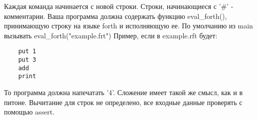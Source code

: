 \documentclass{article}
\begin{document}
\begin{itemize}
            Каждая команда начинается с новой строки. Строки, начинающиеся с '\#' - комментарии.
            Ваша программа должна содержать функцию eval\_forth(), принимающую строку на языке
            forth и исполняющую ее. По умолчанию из main вызывать eval\_forth("example.frt")
            Пример, если в example.rft будет:

\begin{verbatim}
    put 1
    put 3
    add
    print
\end{verbatim}

            То программа должна напечатать '4'. Сложение имеет такой же смысл, как и в питоне. 
            Вычитание для строк не определено, все входные данные проверять с помощью assert.

\end{itemize}
\newpage
\end{document}
